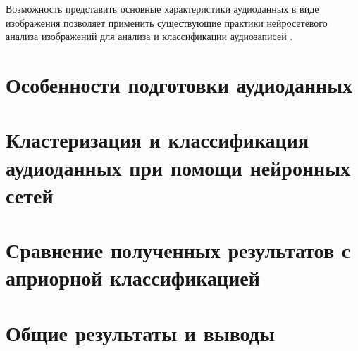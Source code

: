 Возможность представить основные характеристики аудиоданных в виде изображения позволяет применить существующие практики
нейросетевого анализа изображений для анализа и классификации аудиозаписей \cite{cyber_alex}.

\chapter{Особенности подготовки аудиоданных}
\chapter{Кластеризация и классификация аудиоданных при помощи нейронных сетей}
\chapter{Сравнение полученных результатов с априорной классификацией}
\chapter{Общие результаты и выводы}